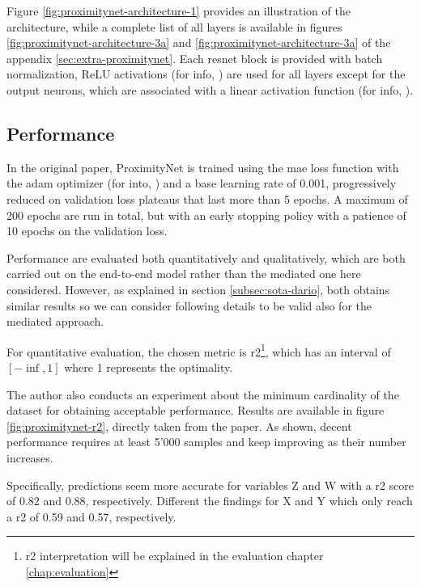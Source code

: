 Figure \ref{fig:proximitynet-architecture-1} provides an illustration of the architecture, while a complete list of all layers is available in figures \ref{fig:proximitynet-architecture-3a} and \ref{fig:proximitynet-architecture-3a} of the appendix \ref{sec:extra-proximitynet}. Each \gls{resnet} block is provided with batch normalization, ReLU activations (for info, \cite{act-relu}) are used for all layers except for the output neurons, which are associated with a linear activation function (for info, \cite{act-linear}). 



\subsection{Performance}
\label{subsec:proximitynet-performance}

In the original paper, ProximityNet is trained using the \gls{mae} loss function with the \gls{adam} optimizer (for into, \cite{kingma2014adam}) and a base learning rate of 0.001, progressively reduced on validation loss plateaus that last more than 5 epochs. A maximum of 200 epochs are run in total, but with an early stopping policy with a patience of 10 epochs on the validation loss. 

Performance are evaluated both quantitatively and qualitatively, which are both carried out on the end-to-end model rather than the mediated one here considered. However, as explained in section \ref{subsec:sota-dario}, both obtains similar results so we can consider following details to be valid also for the mediated approach.

\medskip 

For quantitative evaluation, the chosen metric is \gls{r2}\footnote{\gls{r2} interpretation will be explained in the evaluation chapter \ref{chap:evaluation}}, which has an interval of $[-\inf, 1]$ where 1 represents the optimality. 

The author also conducts an experiment about the minimum cardinality of the dataset for obtaining acceptable performance. Results are available in figure \ref{fig:proximitynet-r2}, directly taken from the paper. As shown, decent performance requires at least 5'000 samples and keep improving as their number increases.

Specifically, predictions seem more accurate for variables Z and W with a \gls{r2} score of 0.82 and 0.88, respectively. Different the findings for X and Y which only reach a \gls{r2} of 0.59 and 0.57, respectively.

